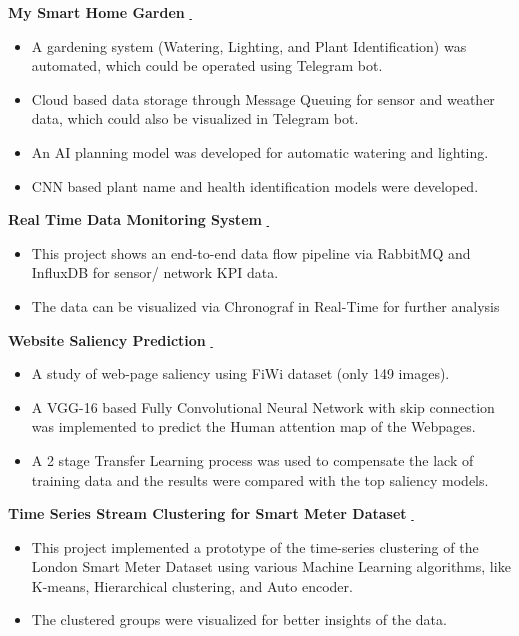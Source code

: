 \documentclass[10pt,a4paper,ragged2e]{classfile}
\let\orighref\href
\renewcommand{\href}[2]{\orighref{#1}{#2\,\faExternalLink}}
\begin{document}
\textbf{My Smart Home Garden}
\href{https://github.com/Niloy-Chakraborty/Smart-Gardening}{}
\begin{itemize}[label=\textcolor{blue}{\textbullet}]
\item A gardening system (Watering, Lighting, and Plant Identification) was automated, which could be operated using Telegram bot.
\item Cloud based data storage through Message Queuing for sensor and weather data, which could also be visualized in Telegram bot.
\item An AI planning model was developed for automatic watering and lighting. 
\item CNN based plant name and health identification models were developed.
\end{itemize}

\textbf{Real Time Data Monitoring System}
\href{https://github.com/Niloy-Chakraborty/Real-Time-Data-Monitoring-System}{}

\begin{itemize}[label=\textcolor{blue}{\textbullet}]
\item This project shows an end-to-end data flow pipeline via RabbitMQ and InfluxDB for sensor/ network KPI data.
\item The data can be visualized via Chronograf in Real-Time for further analysis
\end{itemize}

\textbf{Website Saliency Prediction}
\href{https://github.com/Niloy-Chakraborty/Webpage_Saliency_Prediction}{}
\begin{itemize}[label=\textcolor{blue}{\textbullet}]
\item A study of web-page saliency using FiWi dataset (only 149 images). 
\item A VGG-16 based Fully Convolutional Neural Network with skip connection was implemented to predict the Human attention map of the Webpages.
\item A 2 stage Transfer Learning process was used to compensate the lack of training data and the results were compared with the top saliency models.

\end{itemize}

\textbf{Time Series Stream Clustering for Smart Meter Dataset}
\href{https://github.com/Niloy-Chakraborty/Time-Series_Clustering_on_London_Smart_Meter_Dataset}{}
\begin{itemize}[label=\textcolor{blue}{\textbullet}]
\item This project implemented a prototype of the time-series clustering of the London Smart Meter Dataset using various Machine Learning algorithms, like K-means, Hierarchical clustering, and Auto encoder.
\item The clustered groups were visualized for better insights of the data.
\end{itemize}
\end{document}
